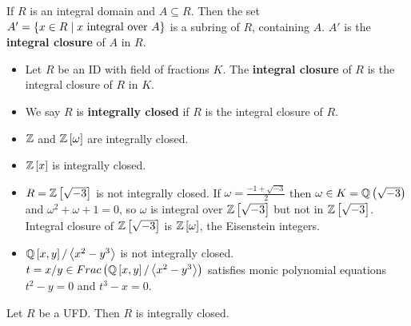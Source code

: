 \begin{corollary}
If $ R $ is an integral domain and $ A \subseteq R $. Then the set $ A' = \cb{x \in R \mid x \ \text{integral over} \ A} $ is a subring of $ R $, containing $ A $. $ A' $ is the \textbf{integral closure} of $ A $ in $ R $.
\end{corollary}

\begin{definition}
\hfill
\begin{itemize}
\item Let $ R $ be an ID with field of fractions $ K $. The \textbf{integral closure} of $ R $ is the integral closure of $ R $ in $ K $.
\item We say $ R $ is \textbf{integrally closed} if $ R $ is the integral closure of $ R $.
\end{itemize}
\end{definition}

\begin{example*}
\hfill
\begin{itemize}
\item $ \mathbb{Z} $ and $ \mathbb{Z}\left[ \omega \right] $ are integrally closed.
\item $ \mathbb{Z}\left[ x \right] $ is integrally closed.
\item $ R = \mathbb{Z}\left[ \sqrt{-3} \right] $ is not integrally closed. If $ \omega = \tfrac{-1 + \sqrt{-3}}{2} $ then $ \omega \in K = \mathbb{Q}\left( \sqrt{-3} \right) $ and $ \omega^2 + \omega + 1 = 0 $, so $ \omega $ is integral over $ \mathbb{Z}\left[ \sqrt{-3} \right] $ but not in $ \mathbb{Z}\left[ \sqrt{-3} \right] $. Integral closure of $ \mathbb{Z}\left[ \sqrt{-3} \right] $ is $ \mathbb{Z}\left[ \omega \right] $, the Eisenstein integers.
\item $ \mathbb{Q}\left[ x, y \right] / \left\langle x^2 - y^3 \right\rangle $ is not integrally closed. $ t = x / y \in Frac\left( \mathbb{Q}\left[ x, y \right] / \left\langle x^2 - y^3 \right\rangle \right) $ satisfies monic polynomial equations $ t^2 - y = 0 $ and $ t^3 - x = 0 $.
\end{itemize}
\end{example*}


\begin{proposition}
Let $ R $ be a UFD. Then $ R $ is integrally closed.
\end{proposition}

